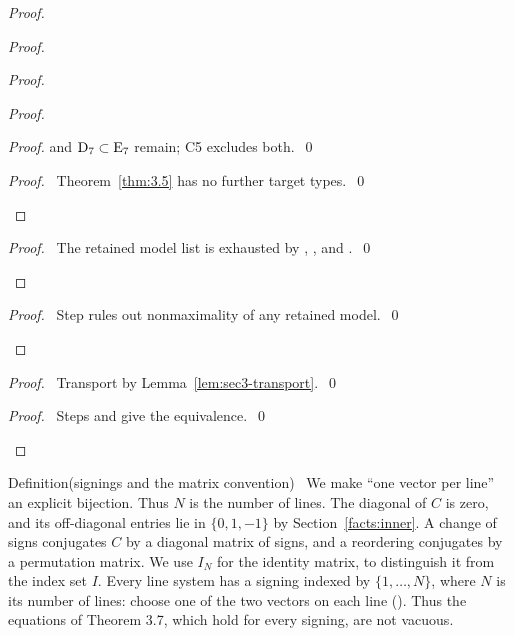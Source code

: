 \begin{proof}
\begin{proof}
\begin{proof}
\begin{proof}
\begin{proof}
     and $\mathrm{D}_7\subset \mathrm{E}_7$ remain; C5 excludes both.~\qed\end{proof}
    \qedstep
    \begin{proof}\pf\ Theorem~\ref{thm:3.5} has no further target types.~\qed\end{proof}
   \end{proof}
   \qedstep
   \begin{proof}\pf\ The retained model list is exhausted by
    , , and .~\qed\end{proof}
  \end{proof}
  \qedstep
  \begin{proof}\pf\ Step  rules out nonmaximality of any retained model.~\qed\end{proof}
 \end{proof}
 \begin{proof}\pf\ Transport  by
  Lemma~\ref{lem:sec3-transport}.~\qed\end{proof}
 \qedstep
 \begin{proof}\pf\ Steps  and  give the equivalence.~\qed\end{proof}
\end{proof}

\begin{namedresult}{Definition}{(signings and the matrix convention)}\label{def:sec3-signing}
 \new\ We make ``one vector per line'' an explicit bijection.
 Thus $N$ is the number of lines. The diagonal of $C$ is zero, and its off-diagonal
 entries lie in $\{0,1,-1\}$ by Section~\ref{facts:inner}. A change of signs conjugates
 $C$ by a diagonal matrix of signs, and a reordering conjugates by a permutation matrix.
 We use $I_N$ for the identity matrix, to distinguish it from the index set $I$.
 Every line system has a signing indexed by $\{1,\dots,N\}$, where $N$ is its number of lines:
 choose one of the two vectors on each line (). Thus the
 equations of Theorem 3.7, which hold for every signing, are not vacuous.
\end{namedresult}

